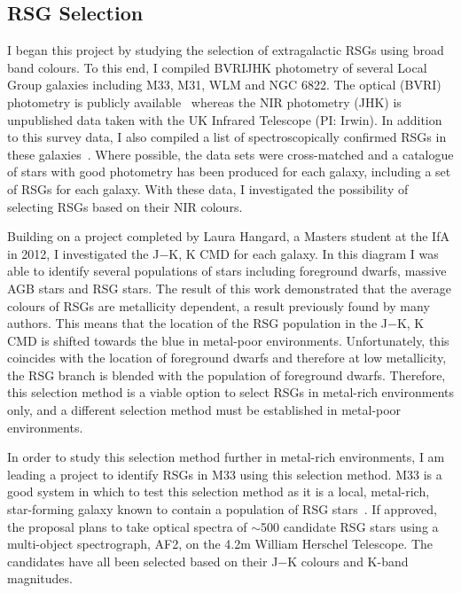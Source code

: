 \documentclass[a4paper,12pt]{article}
\begin{document}
\subsection{RSG Selection}\label{progress-selection}
I began this project by studying the selection of extragalactic RSGs using broad band colours.
To this end, I compiled BVRIJHK photometry of several Local Group galaxies including M33, M31, WLM and NGC 6822. 
The optical (BVRI) photometry is publicly available~\citep{Massey06,Massey07} whereas the NIR photometry (JHK) is unpublished data taken with the UK Infrared Telescope (PI: Irwin).
In addition to this survey data, I also compiled a list of spectroscopically confirmed RSGs in these galaxies~\citep{Massey09,Drout12,Levesque12}.
Where possible, the data sets were cross-matched and a catalogue of stars with good photometry has been produced for each galaxy, including a set of RSGs for each galaxy. 
With these data, I investigated the possibility of selecting RSGs based on their NIR colours. 

Building on a project completed by Laura Hangard, a Masters student at the IfA in 2012, I investigated the J$-$K, K CMD for each galaxy.
In this diagram I was able to identify several populations of stars including foreground dwarfs, massive AGB stars and RSG stars. 
The result of this work demonstrated that the average colours of RSGs are metallicity dependent, a result previously found by many authors.
This means that the location of the RSG population in the J$-$K, K CMD is shifted towards the blue in metal-poor environments. 
Unfortunately, this coincides with the location of foreground dwarfs and therefore at low metallicity, the RSG branch is blended with the population of foreground dwarfs.
Therefore, this selection method is a viable option to select RSGs in metal-rich environments only, and a different selection method must be established in metal-poor environments. 

In order to study this selection method further in metal-rich environments, I am leading a project to identify RSGs in M33 using this selection method. 
M33 is a good system in which to test this selection method as it is a local, metal-rich, star-forming galaxy known to contain a population of RSG stars~\citep[e.g.][]{Drout12}.
If approved, the proposal plans to take optical spectra of $\sim$500 candidate RSG stars using a multi-object spectrograph, AF2, on the 4.2m William Herschel Telescope. 
The candidates have all been selected based on their J$-$K colours and K-band magnitudes. 
\end{document}
